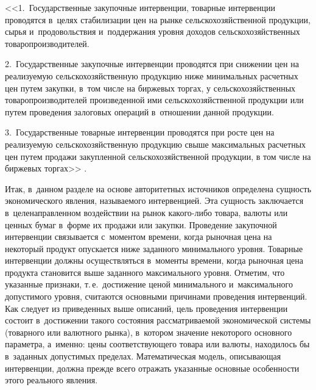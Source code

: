 \begin{multicols}{2}
<<1.\ Государственные закупочные интервенции, товарные интервенции
проводятся в~целях стабилизации цен на рынке сельскохозяйственной
продукции, сырья и~продовольствия и~поддержания уровня доходов
сельскохозяйственных товаропроизводителей.

2.\ Государственные закупочные интервенции проводятся при
снижении цен на реализуемую сельскохозяйственную продукцию ниже
минимальных расчетных цен путем закупки, в~том числе на биржевых торгах,
у сельскохозяйственных товаропроизводителей произведенной ими
сельскохозяйственной продукции или путем проведения залоговых операций в~отношении данной продукции.

3.\ Государственные товарные интервенции проводятся при росте
цен на реализуемую сельско\-хозяйственную продукцию свыше максимальных\linebreak
расчетных цен путем продажи закупленной сельскохозяйственной продукции,
в том числе на биржевых торгах>> \cite{SN3}.


Итак, в~данном разделе на основе авторитетных источников определена сущность 
экономического явления,
называемого интервенцией. Эта сущность заключается в~целенаправленном
воздействии на рынок ка\-ко\-го-ли\-бо товара, валюты или ценных бумаг в~форме
их продажи или закупки. Проведение закупочной интервенции связывается с~моментом времени, когда рыночная цена на некоторый продукт опускается
ниже заданного минимального уровня. Товарные интервенции должны
осуществляться в~моменты времени, когда рыночная цена продукта становится выше 
заданного максимального уровня. Отметим, что указанные
признаки, т.\,е.\ достижение ценой минимального и~максимального
допустимого уровня, считаются основными причинами проведения
интервенций. Как следует из приведенных выше описаний, цель проведения
интервенции состоит в~достижении такого состояния рассматриваемой
экономической системы (товарного или валютного рынка), в~котором значение 
некоторого основного параметра, а~именно: цены соответствующего товара или 
валюты, находилось бы в~заданных допустимых пределах. Математическая модель, 
описывающая интервенции,
должна прежде всего отражать указанные основные особенности этого
реального явления.


\begin{figure*}[b] %
\vspace*{-6pt}
 \begin{center}
 \mbox{%
 \epsfxsize=151.139mm 
 }
 \end{center}
   \vspace*{-9pt}
\label{fig1}
\end{figure*}
\vspace*{-6pt}


\end{multicols}
